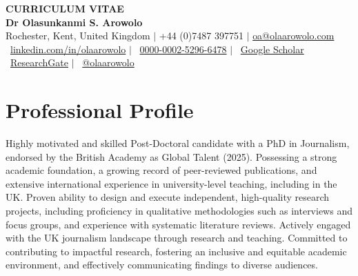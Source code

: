 \documentclass[a4paper,11pt]{article}
\begin{document}
\begin{center}
    \textbf{\Huge \scshape CURRICULUM VITAE} \\
    \vspace{5pt}
    \textbf{\Large Dr Olasunkanmi S. Arowolo} \\ \vspace{1pt}
    \small Rochester, Kent, United Kingdom $|$ +44 (0)7487 397751 $|$ \href{mailto:oa@olaarowolo.com}{{oa@olaarowolo.com}} \\
    \vspace{3pt}
    \small \faLinkedin\ \href{https://www.linkedin.com/in/olaarowolo/}{linkedin.com/in/olaarowolo} $|$ 
    \faOrcid\ \href{https://orcid.org/0000-0002-5296-6478}{0000-0002-5296-6478} $|$ 
    \faGoogleScholar\ \href{https://scholar.google.com/citations?user=3N_RQWoAAAAJ&hl=en}{Google Scholar} \\
    \vspace{2pt}
    \small \faResearchgate\ \href{https://www.researchgate.net/profile/Sunday-Arowolo}{ResearchGate} $|$ 
    \faTwitter\ \href{https://twitter.com/olaarowolo}{@olaarowolo}
\end{center}

\section{Professional Profile}
\small{Highly motivated and skilled Post-Doctoral candidate with a PhD in Journalism, endorsed by the British Academy as Global Talent (2025). Possessing a strong academic foundation, a growing record of peer-reviewed publications, and extensive international experience in university-level teaching, including in the UK. Proven ability to design and execute independent, high-quality research projects, including proficiency in qualitative methodologies such as interviews and focus groups, and experience with systematic literature reviews. Actively engaged with the UK journalism landscape through research and teaching. Committed to contributing to impactful research, fostering an inclusive and equitable academic environment, and effectively communicating findings to diverse audiences.}

\end{document}
